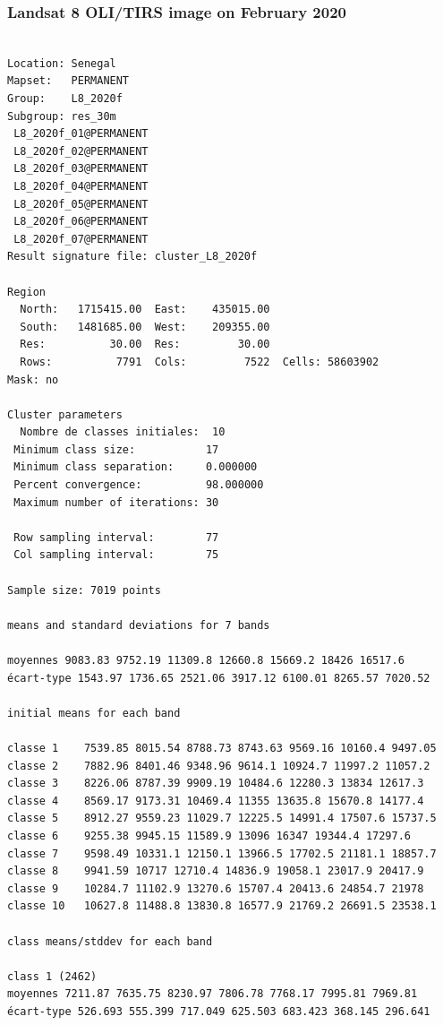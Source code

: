 \documentclass[earth,article,submit,pdftex,moreauthors]{Definitions/mdpi}
\begin{document}
\subsubsection[\appendixname~\thesubsubsection]{Landsat 8 OLI/TIRS image on February 2020}
\begin{scriptsize}
\begin{verbatim}

Location: Senegal
Mapset:   PERMANENT
Group:    L8_2020f
Subgroup: res_30m
 L8_2020f_01@PERMANENT
 L8_2020f_02@PERMANENT
 L8_2020f_03@PERMANENT
 L8_2020f_04@PERMANENT
 L8_2020f_05@PERMANENT
 L8_2020f_06@PERMANENT
 L8_2020f_07@PERMANENT
Result signature file: cluster_L8_2020f

Region
  North:   1715415.00  East:    435015.00
  South:   1481685.00  West:    209355.00
  Res:          30.00  Res:         30.00
  Rows:          7791  Cols:         7522  Cells: 58603902
Mask: no

Cluster parameters
  Nombre de classes initiales: 	10
 Minimum class size:           17
 Minimum class separation:     0.000000
 Percent convergence:          98.000000
 Maximum number of iterations: 30

 Row sampling interval:        77
 Col sampling interval:        75

Sample size: 7019 points

means and standard deviations for 7 bands

moyennes 9083.83 9752.19 11309.8 12660.8 15669.2 18426 16517.6
écart-type 1543.97 1736.65 2521.06 3917.12 6100.01 8265.57 7020.52

initial means for each band

classe 1    7539.85 8015.54 8788.73 8743.63 9569.16 10160.4 9497.05
classe 2    7882.96 8401.46 9348.96 9614.1 10924.7 11997.2 11057.2
classe 3    8226.06 8787.39 9909.19 10484.6 12280.3 13834 12617.3
classe 4    8569.17 9173.31 10469.4 11355 13635.8 15670.8 14177.4
classe 5    8912.27 9559.23 11029.7 12225.5 14991.4 17507.6 15737.5
classe 6    9255.38 9945.15 11589.9 13096 16347 19344.4 17297.6
classe 7    9598.49 10331.1 12150.1 13966.5 17702.5 21181.1 18857.7
classe 8    9941.59 10717 12710.4 14836.9 19058.1 23017.9 20417.9
classe 9    10284.7 11102.9 13270.6 15707.4 20413.6 24854.7 21978
classe 10   10627.8 11488.8 13830.8 16577.9 21769.2 26691.5 23538.1

class means/stddev for each band

class 1 (2462)
moyennes 7211.87 7635.75 8230.97 7806.78 7768.17 7995.81 7969.81
écart-type 526.693 555.399 717.049 625.503 683.423 368.145 296.641


\end{verbatim}
\end{scriptsize}
\end{document}
